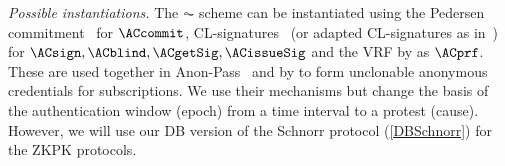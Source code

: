 \emph{Possible instantiations.}
The \(\AC\) scheme can be instantiated using the Pedersen commitment~\cite{PedersenCommitment} for \(\ACcommit\),
CL-signatures~\cite{CLsignatures} (or adapted CL-signatures as in~\cite{AnonPass}) for \(\ACsign, \ACblind, \ACgetSig, \ACissueSig\) and the \ac{VRF} by \citet{DY-VRF} as \(\ACprf\).
These are used together in Anon-Pass~\cite{AnonPass} and by 
\textcite{HowToWinTheCloneWars} to form unclonable anonymous credentials for 
subscriptions.
We use their mechanisms but change the basis of the authentication window 
(epoch) from a time interval to a protest (cause).
However, we will use our \ac{DB} version of the Schnorr protocol 
(\cref{DBSchnorr}) for the \ac{ZKPK} protocols.
